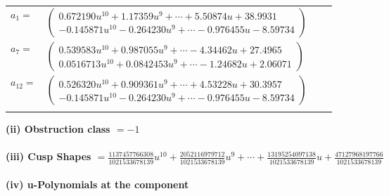 \documentclass[1p]{elsarticle_modified}
\theoremstyle{definition}
\begin{document}
\begin{tabular}{m{7pt} m{180pt} m{7pt} m{180pt} }
\flushright $a_{1}=$&$\begin{pmatrix}0.672190 u^{10}+1.17359 u^{9}+\cdots+5.50874 u+38.9931\\-0.145871 u^{10}-0.264230 u^{9}+\cdots-0.976455 u-8.59734\end{pmatrix}$ \\
\flushright $a_{7}=$&$\begin{pmatrix}0.539583 u^{10}+0.987055 u^{9}+\cdots-4.34462 u+27.4965\\0.0516713 u^{10}+0.0842453 u^{9}+\cdots-1.24682 u+2.06071\end{pmatrix}$ \\
\flushright $a_{12}=$&$\begin{pmatrix}0.526320 u^{10}+0.909361 u^{9}+\cdots+4.53228 u+30.3957\\-0.145871 u^{10}-0.264230 u^{9}+\cdots-0.976455 u-8.59734\end{pmatrix}$\\&\end{tabular}
\flushleft \textbf{(ii) Obstruction class $= -1$}\\~\\
\flushleft \textbf{(iii) Cusp Shapes $= \frac{1137457766308}{1021533678139} u^{10}+\frac{2052116979712}{1021533678139} u^9+\cdots+\frac{13195254097138}{1021533678139} u+\frac{47127968197766}{1021533678139}$}\\~\\
\newpage\renewcommand{\arraystretch}{1}
\flushleft \textbf{(iv) u-Polynomials at the component}\newline \\
\end{document}
